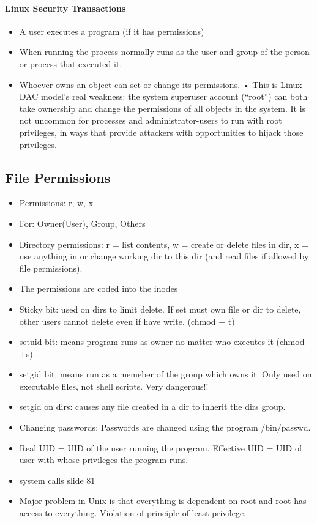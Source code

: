 \paragraph{Linux Security Transactions}
\begin{itemize}
    \item A user executes a program (if it has permissions)
    \item When running the process normally runs as the user and group of the person or process that executed it.
    \item Whoever owns an object can set or change its permissions. • This is Linux DAC model’s real weakness: the system superuser account (“root”) can both take ownership and change the permissions of all objects in the system. It is not uncommon for processes and administrator-users to run with root privileges, in ways that provide attackers with opportunities to hijack those privileges.
\end{itemize}

\subsection{File Permissions}

\begin{itemize}
    \item Permissions: r, w, x
    \item For: Owner(User), Group, Others
    \item Directory permissions: r = list contents, w = create or delete files in dir, x = use anything in or change working dir to this dir (and read files if allowed by file permissions).
    \item The permissions are coded into the inodes
    \item Sticky bit: used on dirs to limit delete. If set must own file or dir to delete, other users cannot delete even if have write. (chmod + t)
    \item setuid bit: means program runs as owner no matter who executes it (chmod +s).
    \item setgid bit: means run as a memeber of the group which owns it. Only used on executable files, not shell scripts. Very dangerous!!
    \item setgid on dirs: causes any file created in a dir to inherit the dirs group.
    \item Changing passwords: Passwords are changed using the program /bin/passwd.
    \item Real UID = UID of the user running the program. Effective UID = UID of user with whose privileges the program runs.
    \item system calls slide 81
    \item Major problem in Unix is that everything is dependent on root and root has access to everything. Violation of principle of least privilege.
\end{itemize}

